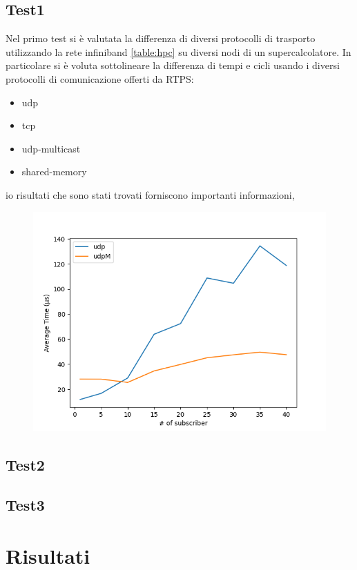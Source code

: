 \subsection{Test1}
Nel primo test si è valutata la differenza di diversi protocolli di trasporto utilizzando la rete infiniband \ref{table:hpc} su diversi nodi di un supercalcolatore. In particolare si è voluta sottolineare la differenza di tempi e cicli usando i diversi protocolli di comunicazione offerti da RTPS:
\begin{itemize}
    \item udp
    \item tcp 
    \item udp-multicast %
    \item shared-memory
\end{itemize}

io risultati che sono stati trovati forniscono importanti informazioni,
\begin{figure}[H]
    \includegraphics[width=\textwidth]{./results/test3_udpvsudpM.png} %
        \caption{}
        \label{}
\end{figure}

\subsection{Test2}
\subsection{Test3}

\section{Risultati}
